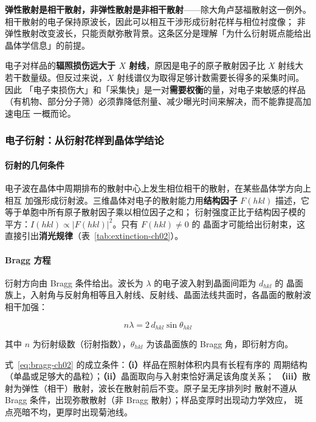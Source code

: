 \begin{keycond}
\textbf{弹性散射是相干散射，非弹性散射是非相干散射}——除大角卢瑟福散射这一例外。
相干散射的电子保持原波长，因此可以相互干涉形成衍射花样与相位衬度像；
非弹性散射改变波长，只能贡献弥散背景。这条区分是理解「为什么衍射斑点能给出
晶体学信息」的前提。
\end{keycond}

\begin{pitfall}
电子对样品的\textbf{辐照损伤远大于 $X$ 射线}，原因是电子的原子散射因子比 $X$ 射线大
若干数量级。但反过来说，$X$ 射线谱仪为取得足够计数需要长得多的采集时间。因此
「电子束损伤大」和「采集快」是一对\textbf{需要权衡}的量，对电子束敏感的样品
（有机物、部分分子筛）必须靠降低剂量、减少曝光时间来解决，而不能靠提高加速电压
一概而论。
\end{pitfall}

\subsubsection{电子衍射：从衍射花样到晶体学结论}

\paragraph{衍射的几何条件}
电子波在晶体中周期排布的散射中心上发生相位相干的散射，在某些晶体学方向上相互
加强形成衍射波。三维晶体对电子的散射能力用\textbf{结构因子}
$F(hkl)$ 描述，它等于单胞中所有原子散射因子乘以相位因子之和；
衍射强度正比于结构因子模的平方：$I(hkl)\propto|F(hkl)|^{2}$。只有 $F(hkl)\neq 0$ 的
晶面才可能给出衍射束，这直接引出\textbf{消光规律}（表~\ref{tab:extinction-ch02}）。

\paragraph{Bragg 方程}
衍射方向由 Bragg 条件给出。波长为 $\lambda$ 的电子波入射到晶面间距为 $d_{hkl}$ 的
晶面族上，入射角与反射角相等且入射线、反射线、晶面法线共面时，各晶面的散射波
相干加强：

\begin{equation}\label{eq:bragg-ch02}
n\lambda=2\,d_{hkl}\sin\theta_{hkl}
\end{equation}

其中 $n$ 为衍射级数（衍射指数），$\theta_{hkl}$ 为该晶面族的 Bragg 角，即衍射方向。
\begin{keycond}
式~\eqref{eq:bragg-ch02} 的成立条件：\textbf{（i）}样品在照射体积内具有长程有序的
周期结构（单晶或足够大的晶粒）；\textbf{（ii）}晶面取向与入射束恰好满足该角度关系；
\textbf{（iii）}散射为弹性（相干）散射，波长在散射前后不变。原子呈无序排列时
散射不遵从 Bragg 条件，出现弥散散射（非 Bragg 散射）；样品变厚时出现动力学效应，
斑点亮暗不均，更厚时出现菊池线。
\end{keycond}

